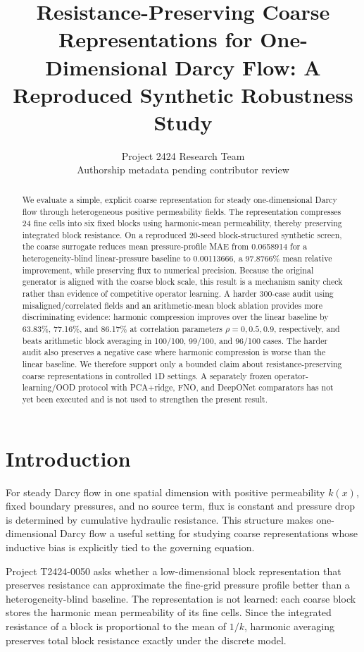\documentclass[10pt]{article}
\title{Resistance-Preserving Coarse Representations for One-Dimensional Darcy Flow: A Reproduced Synthetic Robustness Study}
\author{Project 2424 Research Team\\\small Authorship metadata pending contributor review}
\date{}
\begin{document}
\maketitle

\begin{abstract}
We evaluate a simple, explicit coarse representation for steady one-dimensional Darcy flow through heterogeneous positive permeability fields. The representation compresses 24 fine cells into six fixed blocks using harmonic-mean permeability, thereby preserving integrated block resistance. On a reproduced 20-seed block-structured synthetic screen, the coarse surrogate reduces mean pressure-profile MAE from 0.0658914 for a heterogeneity-blind linear-pressure baseline to 0.00113666, a 97.8766\% mean relative improvement, while preserving flux to numerical precision. Because the original generator is aligned with the coarse block scale, this result is a mechanism sanity check rather than evidence of competitive operator learning. A harder 300-case audit using misaligned/correlated fields and an arithmetic-mean block ablation provides more discriminating evidence: harmonic compression improves over the linear baseline by 63.83\%, 77.16\%, and 86.17\% at correlation parameters $\rho=0,0.5,0.9$, respectively, and beats arithmetic block averaging in 100/100, 99/100, and 96/100 cases. The harder audit also preserves a negative case where harmonic compression is worse than the linear baseline. We therefore support only a bounded claim about resistance-preserving coarse representations in controlled 1D settings. A separately frozen operator-learning/OOD protocol with PCA+ridge, FNO, and DeepONet comparators has not yet been executed and is not used to strengthen the present result.
\end{abstract}

\section{Introduction}
For steady Darcy flow in one spatial dimension with positive permeability $k(x)$, fixed boundary pressures, and no source term, flux is constant and pressure drop is determined by cumulative hydraulic resistance. This structure makes one-dimensional Darcy flow a useful setting for studying coarse representations whose inductive bias is explicitly tied to the governing equation.

Project T2424-0050 asks whether a low-dimensional block representation that preserves resistance can approximate the fine-grid pressure profile better than a heterogeneity-blind baseline. The representation is not learned: each coarse block stores the harmonic mean permeability of its fine cells. Since the integrated resistance of a block is proportional to the mean of $1/k$, harmonic averaging preserves total block resistance exactly under the discrete model.
\end{document}
